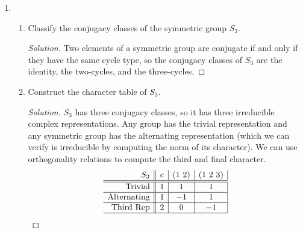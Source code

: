 \documentclass[11pt,letterpaper]{report}
\newenvironment{solution}
{\begin{proof}[Solution]}
{\end{proof}}
\begin{document}
\begin{enumerate}
	\item \begin{enumerate}
		\item Classify the conjugacy classes of the symmetric group $S_3$.
		\begin{solution}
			Two elements of a symmetric group are conjugate if and only if they have the same cycle type, so the conjugacy classes of $S_3$ are the identity, the two-cycles, and the three-cycles.
		\end{solution}
		\item Construct the character table of $S_3$.
		\begin{solution}
			$S_3$ has three conjugacy classes, so it has three irreducible complex representations. Any group has the trivial representation and any symmetric group has the alternating representation (which we can verify is irreducible by computing the norm of its character). We can use orthogonality relations to compute the third and final character.
			\[
			\begin{array}{r||c|c|c|}
				S_3 & e & (1\ 2) & (1\ 2\ 3)\\
				\hline\hline
				\text{Trivial}&1&1&1\\
				\hline
				\text{Alternating}&1 & -1 & 1\\
				\hline
				\text{Third Rep}&2&0&-1\\
				\hline
			\end{array}
			\]
		\end{solution}
	\end{enumerate}
\end{enumerate}
\end{document}
